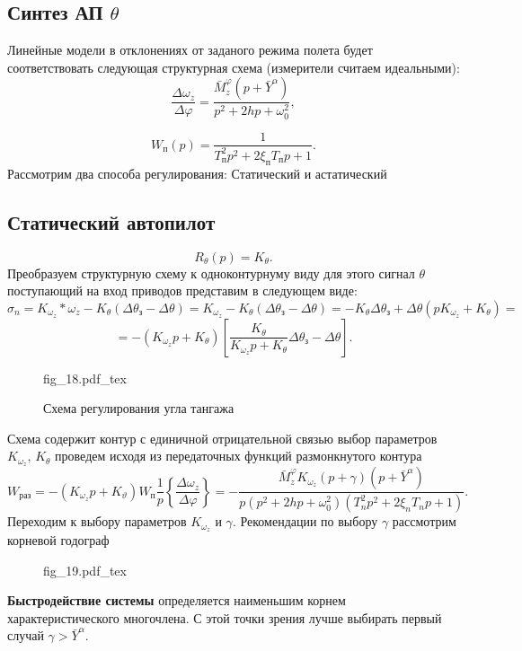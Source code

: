 \documentclass{article}
\begin{document}
\subsection{Синтез АП $\theta$}
Линейные модели в отклонениях от заданого режима полета будет соответствовать следующая структурная схема (измерители считаем идеальными):
\[
\frac{\Delta \omega_z}{\Delta \varphi} = \frac{\bar{M}_z^\varphi (p+\bar{Y}^\alpha)}{p^2 + 2hp + \omega_{0}^2},
\]

\[
W_п(p) = \frac{1}{T_п^2 p^2 + 2 \xi_п T_п p + 1}.
\]
Рассмотрим два способа регулирования: 
Статический и астатический\\
\subsection{Статический автопилот} 
\[
R_{\theta}(p)= K_\theta.
\]
Преобразуем структурную схему к одноконтурнуму виду для этого сигнал $\theta$ поступающий на вход приводов представим в следующем виде: 
\[
\sigma_n = K_{\omega_z}*\omega_z - K_\theta (\Delta \theta_з - \Delta \theta) = K_{\omega_z} - K_{\theta}(\Delta \theta_з - \Delta \theta) = -K_{\theta} \Delta \theta_з + \Delta \theta(p K_{\omega_z} + K_{\theta}) =
\]
\[
= -(K_{\omega_z}p + K_\theta)[\frac{K_\theta}{K_{\omega_z}p + K_{\theta}}\Delta\theta_з - \Delta \theta].
\]

\begin{figure}[ht]
\centering
{fig_18.pdf_tex}
\caption{Схема регулирования угла тангажа} 
\label{fig:18}
\end{figure}

Схема содержит контур с единичной отрицательной связью выбор параметров $K_{\omega_z}, \, K_{\theta}$ проведем исходя из передаточных функций размонкнутого контура
\[
W_{раз} = -(K_{\omega_z} p + K_\vartheta) W_п \frac{1}{p}\left\{{\frac{\Delta \omega_z}{\Delta \varphi}}\right\} = -\frac{\bar{M}_z^\varphi K_{\omega_{z}}(p + \gamma)(p + \bar{Y}^\alpha)}{p(p^2 + 2hp + \omega_0^2)(T_n^2 p^2 + 2 \xi_n T_n p +1)}.
\]
Переходим к выбору параметров $K_{\omega_z}$ и $\gamma$.
Рекомендации по выбору $\gamma$ рассмотрим корневой годограф 

\begin{figure}[H]
\centering
{fig_19.pdf_tex}
\end{figure}

\textbf{Быстродействие системы} определяется наименьшим корнем характеристического многочлена.
С этой точки зрения лучше выбирать первый случай $\gamma > \bar{Y}^\alpha$.\\
\end{document}
